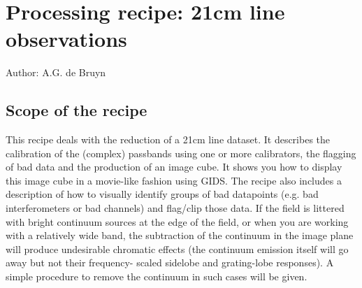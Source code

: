 %
%
%
%
\chapter{Processing recipe: 21cm line observations} 
\tableofcontents 

Author: A.G. de Bruyn 


\section{Scope of the recipe} 
\label{.scope} 

This recipe deals with the reduction of a 21cm line dataset. It describes the
calibration of the (complex) passbands using one or more calibrators, the
flagging of bad data and the production of an image cube. It shows you how to
display this image cube in a movie-like fashion using GIDS. The recipe also
includes a description of how to visually identify groups of bad datapoints
(e.g. bad interferometers or bad channels) and flag/clip those data. If the
field is littered with bright continuum sources at the edge of the field, or
when you are working with a relatively wide band, the subtraction of the
continuum in the image plane will produce undesirable chromatic effects (the
continuum emission itself will go away but not their frequency- scaled sidelobe
and grating-lobe responses). A simple procedure to remove the continuum in such
cases will be given. 




